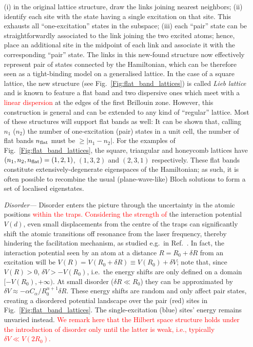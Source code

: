 \documentclass[prl,aps,twocolumn,showpacs,superscriptaddress,longbibliography]{revtex4-1}
\newcommand{\abs}[1]{\left| #1 \right|}
\newcommand{\changer}[1]{\textcolor{red}{#1}}
\begin{document}
(i) in the original lattice structure, draw the links joining nearest neighbors; (ii) identify each site with the state having a single excitation on that site. This exhausts all ``one-excitation'' states in the subspace; (iii) each ``pair'' state can be straightforwardly associated to the link joining the two excited atoms; hence, place an additional site in the midpoint of each link and associate it with the corresponding ``pair'' state. The links in this new-found structure now effectively represent pair of states connected by the Hamiltonian, which can be therefore seen as a tight-binding model on a generalised lattice. In the case of a square lattice, the new structure (see Fig.~\ref{Fig:flat_band_lattices}) is called \emph{Lieb lattice} and is known to feature a flat band and two dispersive ones which meet with a \changer{linear dispersion} at the edges of the first Brillouin zone. However, this construction is general and can be extended to any kind of ``regular'' lattice. Most of these structures will support flat bands as well: It can be shown \cite{SM} that, calling $n_1$ ($n_2$) the number of one-excitation (pair) states in a unit cell, the number of flat bands $n_{\rm flat}$ must be $\geq \abs{n_1 - n_2}$. For the examples of Fig.~\ref{Fig:flat_band_lattices}, the square, triangular and honeycomb lattices have $(n_1,n_2,n_{\rm flat}) = (1,2,1)$, $(1,3,2)$ and $(2,3,1)$ respectively. These flat bands constitute extensively-degenerate eigenspaces of the Hamiltonian; as such, it is often possible to recombine the usual (plane-wave-like) Bloch solutions to form a set of localised eigenstates.

\emph{Disorder---} Disorder enters the picture through the uncertainty in the atomic positions \changer{within the traps. Considering the strength of} the interaction potential $V(d)$, even small displacements from the centre of the traps can significantly shift the atomic transitions off resonance from the laser frequency, thereby hindering the facilitation mechanism, as studied e.g.~in Ref.~\cite{a_Marcuzzi_PRL_17}. In fact, the interaction potential seen by an atom at a distance $R = R_0 + \delta R$ from an excitation will be $V(R) = V(R_0 + \delta R) \equiv V(R_0) + \delta V$; note that, since $V(R) >0$, $\delta V > - V(R_0)$, i.e.~the energy shifts are only defined on a domain $[-V(R_0), +\infty)$. At small disorder ($\delta R \ll R_0$) they can be approximated by $\delta V \approx -\alpha C_\alpha / R_0^{\alpha + 1} \delta R$. These energy shifts are random and only affect pair states, creating a disordered potential landscape over the pair (red) sites in Fig.~\ref{Fig:flat_band_lattices}. The single-excitation (blue) sites' energy remains unvaried instead. \changer{We remark here that the Hilbert space structure holds under the introduction of disorder only until the latter is weak, i.e., typically $\delta V \ll V(2R_0)$. }
\end{document}
